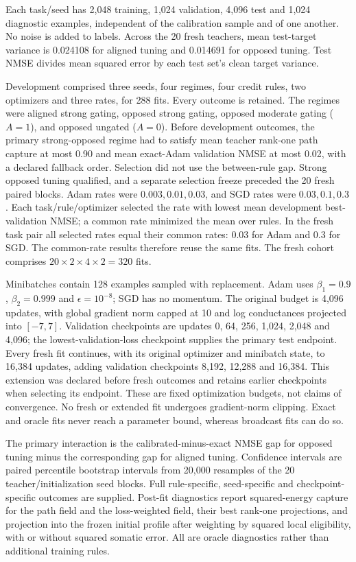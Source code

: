 Each task/seed has 2,048 training, 1,024 validation, 4,096 test and 1,024 diagnostic examples, independent of the calibration sample and of one another. No noise is added to labels. Across the 20 fresh teachers, mean test-target variance is 0.024108 for aligned tuning and 0.014691 for opposed tuning. Test NMSE divides mean squared error by each test set's clean target variance.

Development comprised three seeds, four regimes, four credit rules, two optimizers and three rates, for 288 fits. Every outcome is retained. The regimes were aligned strong gating, opposed strong gating, opposed moderate gating ($A=1$), and opposed ungated ($A=0$). Before development outcomes, the primary strong-opposed regime had to satisfy mean teacher rank-one path capture at most 0.90 and mean exact-Adam validation NMSE at most 0.02, with a declared fallback order. Selection did not use the between-rule gap. Strong opposed tuning qualified, and a separate selection freeze preceded the 20 fresh paired blocks. Adam rates were $0.003,0.01,0.03$, and SGD rates were $0.03,0.1,0.3$. Each task/rule/optimizer selected the rate with lowest mean development best-validation NMSE; a common rate minimized the mean over rules. In the fresh task pair all selected rates equal their common rates: 0.03 for Adam and 0.3 for SGD. The common-rate results therefore reuse the same fits. The fresh cohort comprises $20\times2\times4\times2=320$ fits.

Minibatches contain 128 examples sampled with replacement. Adam uses $\beta_1=0.9$, $\beta_2=0.999$ and $\epsilon=10^{-8}$; SGD has no momentum. The original budget is 4,096 updates, with global gradient norm capped at 10 and log conductances projected into $[-7,7]$. Validation checkpoints are updates 0, 64, 256, 1,024, 2,048 and 4,096; the lowest-validation-loss checkpoint supplies the primary test endpoint. Every fresh fit continues, with its original optimizer and minibatch state, to 16,384 updates, adding validation checkpoints 8,192, 12,288 and 16,384. This extension was declared before fresh outcomes and retains earlier checkpoints when selecting its endpoint. These are fixed optimization budgets, not claims of convergence. No fresh or extended fit undergoes gradient-norm clipping. Exact and oracle fits never reach a parameter bound, whereas broadcast fits can do so.

The primary interaction is the calibrated-minus-exact NMSE gap for opposed tuning minus the corresponding gap for aligned tuning. Confidence intervals are paired percentile bootstrap intervals from 20,000 resamples of the 20 teacher/initialization seed blocks. Full rule-specific, seed-specific and checkpoint-specific outcomes are supplied. Post-fit diagnostics report squared-energy capture for the path field and the loss-weighted field, their best rank-one projections, and projection into the frozen initial profile after weighting by squared local eligibility, with or without squared somatic error. All are oracle diagnostics rather than additional training rules.

